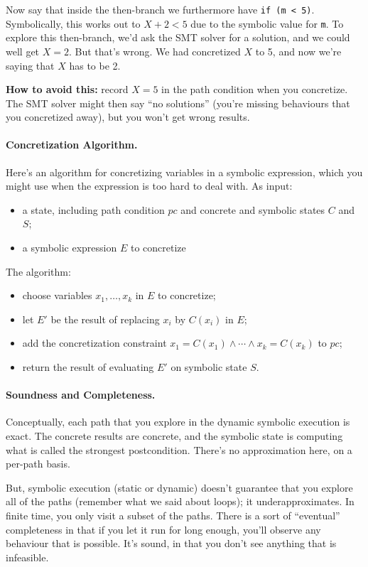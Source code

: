 \documentclass[11pt]{article}
\begin{document}
Now say that inside the then-branch we furthermore have \texttt{if (m < 5)}.
Symbolically, this works out to $X + 2 < 5$ due to the symbolic value for \texttt{m}.
To explore this then-branch, we'd ask the SMT solver for a solution, and we could well get
$X = 2$. But that's wrong. We had concretized $X$ to 5, and now we're saying that $X$ has to be 2.

\textbf{How to avoid this:} record $X = 5$ in the path condition when you concretize. The SMT solver might then say ``no solutions'' (you're missing behaviours that you concretized away), but you won't get wrong results.

\paragraph{Concretization Algorithm.}
Here's an algorithm for concretizing variables in a symbolic expression, which you might use when the expression is too hard to deal with.
As input:
\begin{itemize}[noitemsep]
\item a state, including path condition $\mathit{pc}$ and concrete and symbolic states $C$ and $S$;
\item a symbolic expression $E$ to concretize
\end{itemize}
The algorithm:
\begin{itemize}[noitemsep]
\item choose variables $x_1, \ldots, x_k$ in $E$ to concretize;
\item let $E'$ be the result of replacing $x_i$ by $C(x_i)$ in $E$;
\item add the concretization constraint $x_1 = C(x_1) \wedge \cdots \wedge x_k = C(x_k)$ to $\mathit{pc}$;
\item return the result of evaluating $E'$ on symbolic state $S$.
\end{itemize}

\paragraph{Soundness and Completeness.} Conceptually, each path that you explore in the dynamic symbolic execution is exact. The concrete results are concrete, and the
symbolic state is computing what is called the strongest postcondition. There's no approximation here, on a per-path basis.

But, symbolic execution (static or dynamic) doesn't guarantee that you explore all of the paths (remember what we said about loops); it underapproximates. In finite time, you only visit a subset
of the paths. There is a sort of ``eventual'' completeness in that if you let it run for long enough, you'll observe any behaviour that is possible. It's sound, in that you don't see anything
that is infeasible.
\end{document}
